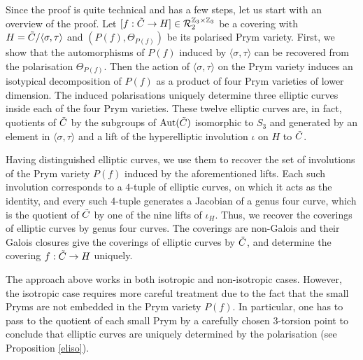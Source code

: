 \documentclass{amsart}
\theoremstyle{remark}
\numberwithin{equation}{section}
\newcommand{\tC}{\Tilde{C}}
\DeclareMathOperator{\Aut}{Aut}
\begin{document}
Since the proof is quite technical and has a few steps, let us start with an overview of the proof.
Let $[f: \tC \to H] \in \mathcal{R}_2^{\mathbb{Z}_3\times \mathbb{Z}_3}$ be a covering with $H = \tC/\langle \sigma, \tau \rangle$ and $(P(f),\Theta_{P(f)})$ be its polarised Prym variety. First, we show that the automorphisms of $P(f)$ induced by $\langle \sigma, \tau\rangle$ can be recovered from the polarisation $\Theta_{P(f)}$. Then the action of $\langle \sigma, \tau \rangle$ on the Prym variety induces an isotypical decomposition of $P(f)$ as a product of four Prym varieties of lower dimension. The induced polarisations  uniquely determine three elliptic curves inside each of the four Prym varieties. These twelve elliptic curves are, in fact, quotients of $\tC$ by the subgroups of $\Aut(\tC)$ isomorphic to $S_3$ and generated by an element in $\langle \sigma, \tau\rangle$ and a lift of the hyperelliptic involution $\iota$ on $H$ to $\tC$. 

Having distinguished elliptic curves, we use them to recover the set of involutions of the Prym variety $P(f)$ induced by the aforementioned lifts. Each such involution corresponds to a $4$-tuple of elliptic curves, on which it acts as the identity, and
every such $4$-tuple generates a Jacobian of a genus four curve, which is the quotient of $\tC$ by one of the nine lifts of $\iota_H$. Thus, we recover the coverings of elliptic curves by genus four curves. The coverings are non-Galois and their Galois closures give the coverings of elliptic curves by $\tC$, and determine the covering $f: \tC \to H$ uniquely. 

The approach above works in both isotropic and non-isotropic cases. However, the isotropic case requires more careful treatment due to the fact that the small Pryms are not embedded in the Prym variety $P(f)$. In particular, one has to pass to the quotient of each small Prym by a carefully chosen $3$-torsion point to conclude that elliptic curves are uniquely determined by the polarisation (see Proposition \ref{eliso}). 
\end{document}
